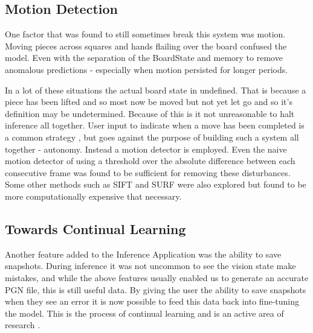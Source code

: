 \subsection{Motion Detection}
One factor that was found to still sometimes break this system was motion.  Moving pieces across squares and hands flailing over the board confused the
model.  Even with the separation of the BoardState and memory to remove anomalous predictions - especially when motion persisted for longer periods.  

In a lot of these situations the actual board state in undefined.  That is because a piece has been lifted and so most now be moved but not yet let go 
and so it's definition may be undetermined.  Because of this is it not unreasonable to halt inference all together.  User input to indicate when a move
has been completed is a common strategy \cite{}, but goes against the purpose of building such a system all together - autonomy.  Instead a motion detector is 
employed.  Even the naive motion detector of using a threshold over the absolute difference between each consecutive frame was found to be sufficient for removing these
disturbances.  Some other methods such as SIFT and SURF were also explored but found to be more computationally expensive that necessary.

\subsection{Towards Continual Learning}
Another feature added to the Inference Application was the ability to save snapshots.  During inference it was not uncommon to see the vision state make mistakes,
and while the above features usually enabled us to generate an accurate PGN file, this is still useful data.
By giving the user the ability to save snapshots when they see an error it is now possible to feed this data back into fine-tuning the model.  This is the process of 
continual learning and is an active area of research \cite{}.